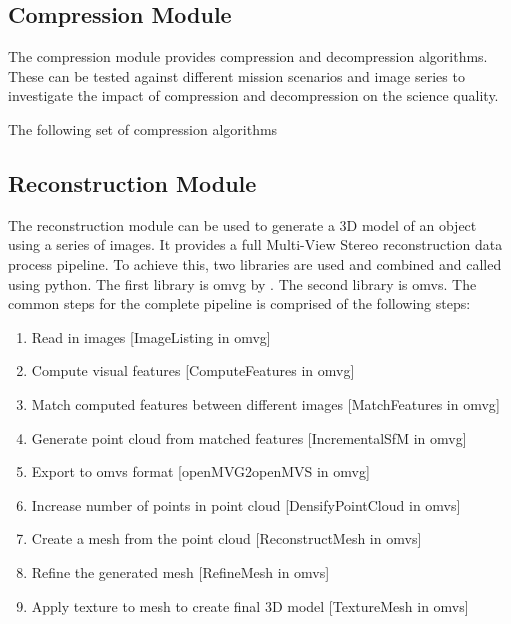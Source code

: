 \subsection{Compression Module}
The compression module provides compression and decompression algorithms. These can be tested against different mission scenarios and image series to investigate the impact of compression and decompression on the science quality.

The following set of compression algorithms 

\subsection{Reconstruction Module}
The reconstruction module can be used to generate a 3D model of an object using a series of images. It provides a full Multi-View Stereo reconstruction data process pipeline. To achieve this, two libraries are used and combined and called using python. The first library is \gls{omvg} by \cite{openMVG}. The second library is \gls{omvs}. 
The common steps for the complete pipeline is comprised of the following steps:
\begin{enumerate}
    \item Read in images [ImageListing in \gls{omvg}]
    \item Compute visual features [ComputeFeatures in \gls{omvg}]
    \item Match computed features between different images [MatchFeatures in \gls{omvg}]
    \item Generate point cloud from matched features [IncrementalSfM in \gls{omvg}]
    \item Export to \gls{omvs} format [openMVG2openMVS in \gls{omvg}]
    \item Increase number of points in point cloud [DensifyPointCloud in \gls{omvs}]
    \item Create a mesh from the point cloud [ReconstructMesh in \gls{omvs}]
    \item Refine the generated mesh [RefineMesh in \gls{omvs}]
    \item Apply texture to mesh to create final 3D model [TextureMesh in \gls{omvs}]
\end{enumerate}

